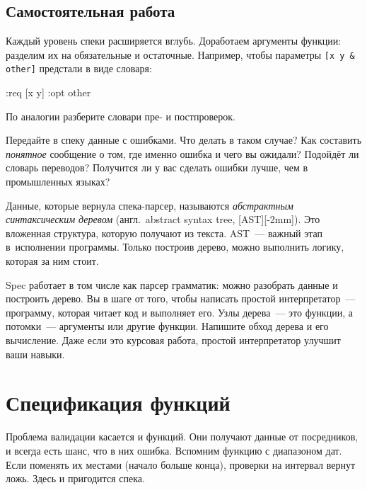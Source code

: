 \subsection{Самостоятельная работа}


Каждый уровень спеки расширяется вглубь. Доработаем аргументы функции: разделим
их на обязательные и остаточные. Например, чтобы параметры \verb|[x y & other]|
предстали в виде словаря:

\begin{english}
  \begin{clojure}
{:req [x y] :opt other}
  \end{clojure}
\end{english}

\noindent
По аналогии разберите словари пре- и постпроверок.

Передайте в спеку данные с ошибками. Что делать в таком случае? Как составить
\emph{понятное} сообщение о том, где именно ошибка и чего вы ожидали? Подойдёт ли
словарь переводов? Получится ли у вас сделать ошибки лучше, чем в промышленных
языках?

Данные, которые вернула спека-парсер, называются \emph{абстрактным синтаксическим деревом}
(англ.~abstract syntax tree, [AST][-2mm]).
Это вложенная структура, которую получают из текста. AST~--- важный этап в~исполнении
программы. Только построив дерево, можно выполнить логику, которая за ним стоит.


Spec работает в том числе как парсер грамматик: можно разобрать данные и
построить дерево. Вы в шаге от того, чтобы написать простой интерпретатор~---
программу, которая читает код и выполняет его. Узлы дерева~--- это функции, а
потомки~--- аргументы или другие функции. Напишите обход дерева и его
вычисление. Даже если это курсовая работа, простой интерпретатор улучшит ваши
навыки.

\section{Спецификация функций}


Проблема валидации касается и функций. Они получают данные от посредников, и
всегда есть шанс, что в них ошибка. Вспомним функцию с диапазоном дат. Если
поменять их местами (начало больше конца), проверки на интервал вернут
ложь. Здесь и пригодится спека.

